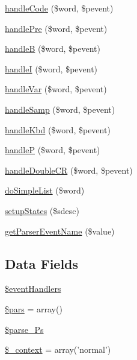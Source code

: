 \begin{DoxyCompactItemize}
\hyperlink{classparser_desc_parser_af219369dc22fd5b0185613f783014227}{handle\-Code} (\$word, \$pevent)
\item 
\hyperlink{classparser_desc_parser_a96a484949d35e92deadfd8025909a02e}{handle\-Pre} (\$word, \$pevent)
\item 
\hyperlink{classparser_desc_parser_acc30e4b5685fa97faf1323cd3d285d18}{handle\-B} (\$word, \$pevent)
\item 
\hyperlink{classparser_desc_parser_ae75966f1aaa391ac8ce193e99c98012c}{handle\-I} (\$word, \$pevent)
\item 
\hyperlink{classparser_desc_parser_a5e19ceeed570fa556cfa546f730a093d}{handle\-Var} (\$word, \$pevent)
\item 
\hyperlink{classparser_desc_parser_a4b176b12753c8add581d4e3a05ef8b28}{handle\-Samp} (\$word, \$pevent)
\item 
\hyperlink{classparser_desc_parser_a0121c5f7e9a9a8b3829ca593f4ef2594}{handle\-Kbd} (\$word, \$pevent)
\item 
\hyperlink{classparser_desc_parser_ab11131ca7f6937d9b69acbe8dc605db4}{handle\-P} (\$word, \$pevent)
\item 
\hyperlink{classparser_desc_parser_a5ad5c30ceb18a6c6213e115c87a554a7}{handle\-Double\-C\-R} (\$word, \$pevent)
\item 
\hyperlink{classparser_desc_parser_a283d793be09acb75d62032c19293b59a}{do\-Simple\-List} (\$word)
\item 
\hyperlink{classparser_desc_parser_ac0c968f33f4c5b5c508edbff129bea20}{setup\-States} (\$sdesc)
\item 
\hyperlink{classparser_desc_parser_a9cc8a14f4bce21f0058f33036a2eb460}{get\-Parser\-Event\-Name} (\$value)
\end{DoxyCompactItemize}
\subsection*{\-Data \-Fields}
\begin{DoxyCompactItemize}
\item 
\hyperlink{classparser_desc_parser_a430675102684e9ab820c7622678832b0}{\$event\-Handlers}
\item 
\hyperlink{classparser_desc_parser_ab8117573961eab022362e6fa8622ee1c}{\$pars} = array()
\item 
\hyperlink{classparser_desc_parser_acd4431aa40ede0304317d587e1f185e6}{\$parse\-\_\-\-Ps}
\item 
\hyperlink{classparser_desc_parser_afdb8d530ec3cfa7ad5382c05736e7ead}{\$\-\_\-context} = array('normal')
\end{DoxyCompactItemize}


